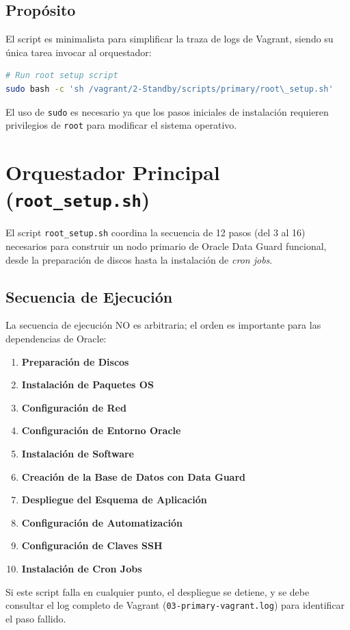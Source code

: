 \documentclass[11pt, a4paper]{report}
\begin{document}
\subsection{Propósito}
El script es minimalista para simplificar la traza de logs de Vagrant, siendo su única tarea invocar al orquestador:
\begin{lstlisting}[language=bash, caption={Invocación del Orquestador}]
# Run root setup script
sudo bash -c 'sh /vagrant/2-Standby/scripts/primary/root\_setup.sh'
\end{lstlisting}
El uso de \texttt{sudo} es necesario ya que los pasos iniciales de instalación requieren privilegios de \texttt{root} para modificar el sistema operativo.
\section{Orquestador Principal (\texttt{root\_setup.sh})}

El script \texttt{root\_setup.sh} coordina la secuencia de 12 pasos (del 3 al 16) necesarios para construir un nodo primario de Oracle Data Guard funcional, desde la preparación de discos hasta la instalación de \textit{cron jobs}.
\subsection{Secuencia de Ejecución}
La secuencia de ejecución NO es arbitraria; el orden es importante para las dependencias de Oracle:
\begin{enumerate}
    \item \textbf{Preparación de Discos}
    \item \textbf{Instalación de Paquetes OS}
    \item \textbf{Configuración de Red}
    \item \textbf{Configuración de Entorno Oracle}
    \item \textbf{Instalación de Software}
    \item \textbf{Creación de la Base de Datos con Data Guard}
    \item \textbf{Despliegue del Esquema de Aplicación}
    \item \textbf{Configuración de Automatización}
    \item \textbf{Configuración de Claves SSH}
    \item \textbf{Instalación de Cron Jobs}
\end{enumerate}
Si este script falla en cualquier punto, el despliegue se detiene, y se debe consultar el log completo de Vagrant (\texttt{03-primary-vagrant.log}) para identificar el paso fallido.
\end{document}
